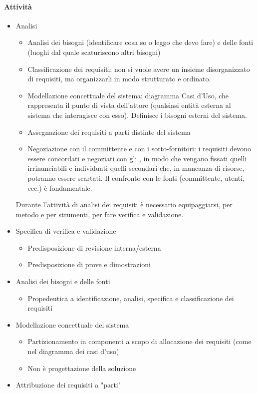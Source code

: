 \paragraph{Attività}
\begin{itemize}
	\item Analisi
		\begin{itemize}
			\item Analisi dei bisogni (identificare cosa so o leggo che devo fare) e delle fonti (luoghi dal quale scaturiscono altri bisogni)
			\item Classificazione dei requisiti: non si vuole avere un insieme disorganizzato di requisiti, ma organizzarli in modo strutturato e ordinato.
			\item Modellazione concettuale del sistema: diagramma Casi d'Uso, che rappresenta il punto di vista dell'attore (qualsiasi entità esterna al sistema che interagisce con esso). Definisce i bisogni esterni del sistema.
			\item Assegnazione dei requisiti a parti distinte del sistema
			\item Negoziazione con il committente e con i sotto-fornitori: i requisiti devono essere concordati e negoziati con gli , in modo che vengano fissati quelli irrinunciabili e individuati quelli secondari che, in mancanza di risorse, potranno essere scartati. Il confronto con le fonti (committente, utenti, ecc.) è fondamentale.
		\end{itemize}
	Durante l'attività di analisi dei requisiti è necessario equipaggiarsi, per metodo e per strumenti, per fare verifica e validazione.
	\item Specifica di verifica e validazione
		\begin{itemize}
			\item Predisposizione di revisione interna/esterna
			\item Predisposizione di prove e dimostrazioni
		\end{itemize}
	\item Analisi dei bisogni e delle fonti
		\begin{itemize}
			\item Propedeutica a identificazione, analisi, specifica e classificazione dei requisiti
		\end{itemize}
	\item Modellazione concettuale del sistema
		\begin{itemize}
			\item Partizionamento in componenti a scopo di allocazione dei requisiti (come nel diagramma dei casi d'uso)
			\item Non è progettazione della soluzione
		\end{itemize}
	\item Attribuzione dei requisiti a "parti"
\end{itemize}

